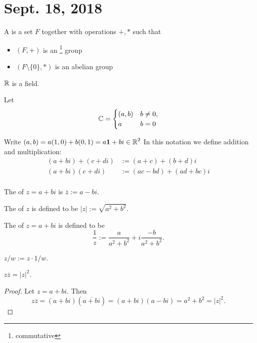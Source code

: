 \documentclass[notes]{subfiles}
\begin{document}
\section{Sept. 18, 2018}

\begin{definition}
    A  is a set $F$ together with operations $+,*$ such that
    \begin{itemize}
        \item $(F,+)$ is an \footnote{commutative} group
        \item $(F \setminus \{ 0 \}, *)$ is an abelian group
    \end{itemize}
\end{definition}

\begin{example}
    $\operatorname{\mathbb{R}}$ is a field.
\end{example}

\noindent
Let
\[ \operatorname{\mathbb{C}} = \begin{cases}
(a,b) & b \ne 0, \\
a & b = 0
\end{cases}
\]

\noindent
Write $(a,b) = a(1,0) + b(0,1) = a\mathbf{1} + bi \in \operatorname{\mathbb{R}}^2$
In this notation we define addition and multiplication:
\begin{align*}
    (a+bi) + (c+di) &:= (a+c) + (b+d)i \\
    (a+bi)(c+di) &:= (ac - bd) + (ad + bc)i \\
\end{align*}

\begin{definition}
    The  of $z = a + bi$ is $\overline{z} := a - bi$.
\end{definition}

\begin{definition}
    The  of $z$ is defined to be $|z| := \sqrt{a^2 + b^2}$.
\end{definition}

\begin{definition}
    The  of $z = a+bi$ is defined to be
    \[ \frac{1}{z} := \frac{a}{a^2 + b^2} + i \frac{-b}{a^2 + b^2}. \]
\end{definition}

\begin{definition}
    $z/w := z \cdot 1/w$.
\end{definition}

\begin{theorem}
    $z\overline{z} = |z|^2$.
\end{theorem}
\begin{proof}
    Let $z = a+bi$.  Then
    \[ z\overline{z} = (a+bi)(\overline{a+bi}) = (a+bi)(a-bi)
    = a^2 + b^2 = |z|^2. \]
\end{proof}
\end{document}
